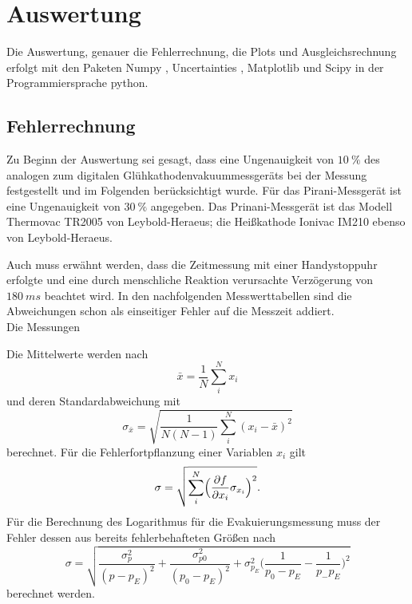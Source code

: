 \section{Auswertung}
Die Auswertung, genauer die Fehlerrechnung, die Plots und Ausgleichsrechnung erfolgt mit den Paketen
Numpy \cite{numpy}, Uncertainties \cite{uncertainties}, Matplotlib \cite{matplotlib} und Scipy \cite{scipy} in der Programmiersprache python.
\subsection{Fehlerrechnung}
Zu Beginn der Auswertung sei gesagt, dass eine Ungenauigkeit von $\SI{10}{\percent}$ des analogen zum digitalen Glühkathodenvakuummessgeräts
bei der Messung festgestellt und im Folgenden berücksichtigt wurde.
Für das Pirani-Messgerät ist eine Ungenauigkeit von $\SI{30}{\percent}$ angegeben\cite{anleitung}.
Das Prinani-Messgerät ist das Modell Thermovac TR2005 von Leybold-Heraeus; die Heißkathode Ionivac IM210 ebenso von Leybold-Heraeus.

Auch muss erwähnt werden, dass die Zeitmessung mit einer Handystoppuhr erfolgte und eine durch menschliche Reaktion verursachte
Verzögerung von $\SI{180}{ms}$ beachtet wird\cite{reaktion}.
In den nachfolgenden Messwerttabellen sind die Abweichungen schon als einseitiger Fehler auf die Messzeit addiert.\\

Die Messungen


Die Mittelwerte werden nach
\begin{equation}
	\bar{x}=\frac{1}{N}\sum_{i}^N x_i
\end{equation}
und deren Standardabweichung mit
\begin{equation}
	\sigma_{\bar{x}} = \sqrt{\frac{1}{N(N-1)} \sum_{i}^N (x_i-\bar{x})^2}
\end{equation}
berechnet.
Für die Fehlerfortpflanzung einer Variablen $x_i$ gilt
\begin{equation}
	\sigma = \sqrt{\sum_{i}^N \Bigl(\frac{\partial f}{\partial x_i} \sigma_{x_i}\Bigr)^2}.
	\label{eq:gaussfehler}
\end{equation}
Für die Berechnung des Logarithmus für die Evakuierungsmessung muss der Fehler dessen aus bereits fehlerbehafteten Größen nach
\begin{equation}
	\sigma = \sqrt{\frac{\sigma_p^2}{(p-p_E)^2}+\frac{\sigma_{p0}^2}{(p_0-p_E)^2}+\sigma_{p_E}^2\bigl(\frac{1}{p_0-p_E}-\frac{1}{p_-p_E}\bigr)^2}
\end{equation}
berechnet werden.
